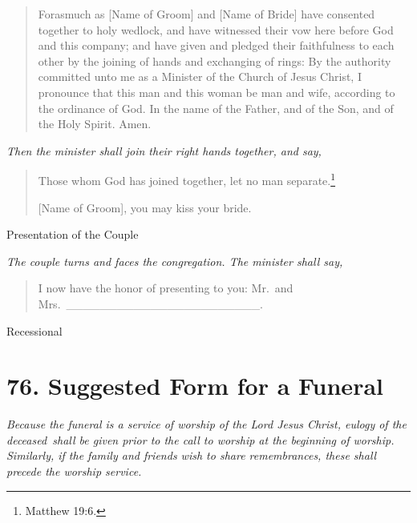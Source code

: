 \documentclass[
]{book}
\begin{document}
\begin{quote}
Forasmuch as {[}Name of Groom{]} and {[}Name of Bride{]} have consented together to holy wedlock, and have witnessed their vow here before God and this company; and have given and pledged their faithfulness to each other by the joining of hands and exchanging of rings: By the authority committed unto me as a Minister of the Church of Jesus Christ, I pronounce that this man and this woman be man and wife, according to the ordinance of God. In the name of the Father, and of the Son, and of the Holy Spirit. Amen.
\end{quote}

\begin{center}
\emph{Then the minister shall join their right hands together, and say,}

\end{center}

\begin{quote}
Those whom God has joined together, let no man separate.\footnote{Matthew 19:6.}

{[}Name of Groom{]}, you may kiss your bride.
\end{quote}

Presentation of the Couple

\begin{center}
\emph{The couple turns and faces the congregation. The minister shall say,}

\end{center}

\begin{quote}
I now have the honor of presenting to you: Mr.~and Mrs.~\_\_\_\_\_\_\_\_\_\_\_\_\_\_\_\_\_\_\_\_\_\_\_.
\end{quote}

Recessional

\hypertarget{suggested-form-for-a-funeral}{%
\section*{76. Suggested Form for a Funeral}\label{suggested-form-for-a-funeral}}

\protect\hypertarget{chapter-slug-76-suggested-form-for-a-funeral}{\href{}{}}

\protect\hypertarget{76}{\href{}{}}\emph{Because the funeral is a service of worship of the Lord Jesus Christ, eulogy of the deceased~shall be given prior to the call to worship at the beginning of worship. Similarly, if the family and friends wish to share remembrances, these shall precede the worship service.}
\end{document}
